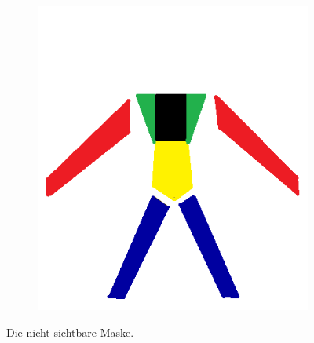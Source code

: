 \documentclass[FIPLY_base.tex]{subfiles}
\begin{document}
\begin{figure}[H]
	\begin{subfigure}[b]{0.3\textwidth}
	\includegraphics[scale=0.3]{img/Uebungskatalog_filter_mask}
	\end{subfigure}
	\hfil
	\caption{Die nicht sichtbare Maske.}
\end{figure}
\end{document}
